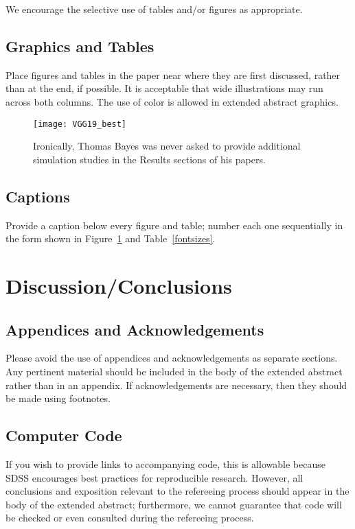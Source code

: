 \documentclass[10pt]{article}
\begin{document}
We encourage the selective use of tables and/or figures as appropriate.

\subsection{Graphics and Tables}

Place figures and tables in the
paper near where they are first discussed, rather than at the end, if
possible.  It is acceptable that wide illustrations
may run across both columns.  The use of color
is allowed in extended abstract graphics.

\begin{figure}[ht]
\begin{center}
\centerline{\texttt{[image: VGG19\_best]}}
\caption{Ironically, Thomas Bayes was never asked to provide additional
simulation studies in the Results sections of his papers.}
\label{bayespic}
\end{center}
\end{figure}

\subsection{Captions}
Provide a caption below every figure and table; number each one
sequentially in the form shown in Figure~\ref{bayespic} and
Table~\ref{fontsizes}.

\section{Discussion/Conclusions}

\subsection{Appendices and Acknowledgements}

Please avoid the use of appendices and acknowledgements
as separate sections.  Any pertinent material should be included in the
body of the extended abstract rather than in an appendix.  If
acknowledgements are necessary, then they should be made using footnotes.

\subsection{Computer Code}

If you wish to provide links to accompanying code, this is allowable because
SDSS encourages best practices for reproducible research.  However, all
conclusions and exposition relevant to the refereeing process should appear in
the body of the extended abstract; furthermore, we cannot guarantee that
code will be checked or even consulted during the refereeing process.
\end{document}
